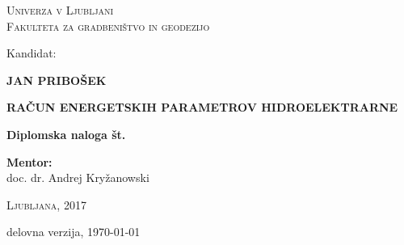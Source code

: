 \thispagestyle{empty}

\begin{minipage}{\textwidth}


\begin{center}
\vspace*{-1.5 cm}
\textsc{Univerza v Ljubljani}\\
\textsc{Fakulteta za gradbeništvo in geodezijo}

\vspace*{5cm}
Kandidat:\\
\vspace*{0.5cm}
\begin{large}
\textbf{JAN PRIBOŠEK}
\end{large}

\vspace*{1cm}

\begin{Large}
\textbf{RAČUN ENERGETSKIH PARAMETROV HIDROELEKTRARNE}
\end{Large}

\vspace*{1cm}

\begin{large}
\textbf{Diplomska naloga št.}
\end{large}

\end{center}
\vspace*{10cm}


\begin{large}
	\textbf{Mentor:}\\
	doc. dr. Andrej Kryžanowski \\
\end{large}

\begin{center}
\textsc{Ljubljana, 2017}

\vspace*{1cm}
delovna verzija, \today

\end{center}

\end{minipage}

\newpage
\thispagestyle{empty}
\cleardoublepage